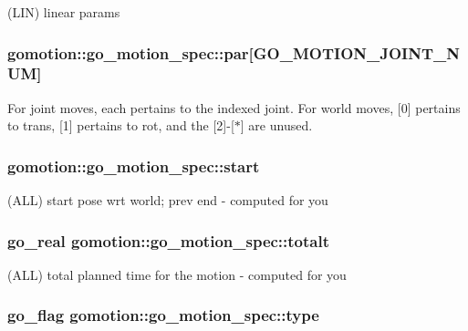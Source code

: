 (L\-I\-N) linear params \hypertarget{structgomotion_1_1go__motion__spec_a71e60787cb50243693e8588918b8fe29}{
\subsubsection[{par}]{ gomotion\-::go\-\_\-motion\-\_\-spec\-::par\mbox{[}G\-O\-\_\-\-M\-O\-T\-I\-O\-N\-\_\-\-J\-O\-I\-N\-T\-\_\-\-N\-U\-M\mbox{]}}}\label{structgomotion_1_1go__motion__spec_a71e60787cb50243693e8588918b8fe29}
For joint moves, each pertains to the indexed joint. For world moves, \mbox{[}0\mbox{]} pertains to trans, \mbox{[}1\mbox{]} pertains to rot, and the \mbox{[}2\mbox{]}-\/\mbox{[}$\ast$\mbox{]} are unused. \hypertarget{structgomotion_1_1go__motion__spec_a87e745675e617e11ea1783a6ea80afa0}{
\subsubsection[{start}]{ gomotion\-::go\-\_\-motion\-\_\-spec\-::start}}\label{structgomotion_1_1go__motion__spec_a87e745675e617e11ea1783a6ea80afa0}
(A\-L\-L) start pose wrt world; prev end -\/ computed for you \hypertarget{structgomotion_1_1go__motion__spec_abf6e879f2b06d62fe0bec48b9d723186}{
\subsubsection[{totalt}]{\setlength{\rightskip}{0pt plus 5cm}go\-\_\-real gomotion\-::go\-\_\-motion\-\_\-spec\-::totalt}}\label{structgomotion_1_1go__motion__spec_abf6e879f2b06d62fe0bec48b9d723186}
(A\-L\-L) total planned time for the motion -\/ computed for you \hypertarget{structgomotion_1_1go__motion__spec_a186231a66a1f1f6d6628cd23baf60530}{
\subsubsection[{type}]{\setlength{\rightskip}{0pt plus 5cm}go\-\_\-flag gomotion\-::go\-\_\-motion\-\_\-spec\-::type}}\label{structgomotion_1_1go__motion__spec_a186231a66a1f1f6d6628cd23baf60530}
